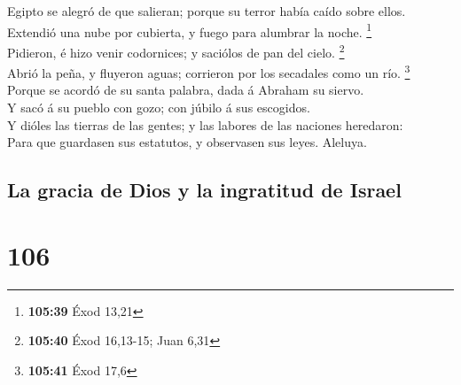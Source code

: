  Egipto se alegró de que salieran; porque su terror había
caído sobre ellos.\\
 Extendió una nube por cubierta, y fuego para alumbrar la
noche. \footnote{\textbf{105:39} Éxod 13,21}\\
 Pidieron, é hizo venir codornices; y saciólos de pan del
cielo. \footnote{\textbf{105:40} Éxod 16,13-15; Juan 6,31}\\
 Abrió la peña, y fluyeron aguas; corrieron por los
secadales como un río. \footnote{\textbf{105:41} Éxod 17,6}\\
 Porque se acordó de su santa palabra, dada á Abraham su
siervo.\\
 Y sacó á su pueblo con gozo; con júbilo á sus
escogidos.\\
 Y dióles las tierras de las gentes; y las labores de las
naciones heredaron:\\
 Para que guardasen sus estatutos, y observasen sus
leyes. Aleluya.

\hypertarget{la-gracia-de-dios-y-la-ingratitud-de-israel}{%
\subsection{La gracia de Dios y la ingratitud de
Israel}\label{la-gracia-de-dios-y-la-ingratitud-de-israel}}

\hypertarget{section-105}{%
\section{106}\label{section-105}}

